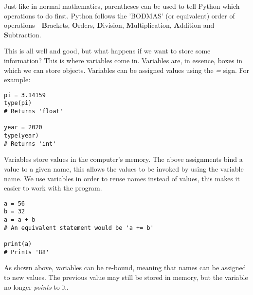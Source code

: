 \documentclass{article}
\begin{document}
Just like in normal mathematics, parentheses can be used to tell Python which operations to do first. Python follows the 'BODMAS' (or equivalent) order of operations - \textbf{B}rackets, \textbf{O}rders, \textbf{D}ivision, \textbf{M}ultiplication, \textbf{A}ddition and \textbf{S}ubtraction. \medskip

This is all well and good, but what happens if we want to store some information? This is where variables come in. Variables are, in essence, boxes in which we can store objects. Variables can be assigned values using the \textit{=} sign. For example:

\begin{verbatim}
pi = 3.14159
type(pi)
# Returns 'float'

year = 2020
type(year)
# Returns 'int'
\end{verbatim}

Variables store values in the computer's memory. The above assignments bind a value to a given name, this allows the values to be invoked by using the variable name. We use variables in order to reuse names instead of values, this makes it easier to work with the program.

\begin{verbatim}
a = 56
b = 32
a = a + b
# An equivalent statement would be 'a += b'

print(a)
# Prints '88'
\end{verbatim}

As shown above, variables can be re-bound, meaning that names can be assigned to new values. The previous value may still be stored in memory, but the variable no longer \textit{points} to it.
\end{document}
